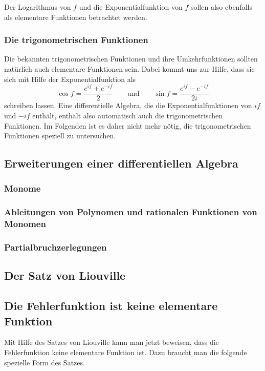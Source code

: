 Der Logarithmus von $f$ und die Exponentialfunktion von $f$ sollen
also ebenfalls als elementare Funktionen betrachtet werden.

\subsubsection{Die trigonometrischen Funktionen}
Die bekannten trigonometrischen Funktionen und ihre Umkehrfunktionen
sollten natürlich auch elementare Funktionen sein.
Dabei kommt uns zur Hilfe, dass sie sich mit Hilfe der Exponentialfunktion
als
\[
\cos f = \frac{e^{if}+e^{-if}}2
\qquad\text{und}\qquad
\sin f = \frac{e^{if}-e^{-if}}{2i}
\]
schreiben lassen.
Eine differentielle Algebra, die die Exponentialfunktionen von $if$ und
$-if$ enthält, enthält also automatisch auch die trigonometrischen
Funktionen.
Im Folgenden ist es daher nicht mehr nötig, die trigonometrischen
Funktionen speziell zu untersuchen.

\subsection{Erweiterungen einer differentiellen Algebra
\label{buch:integrale:section:erweiterungen}}

\subsubsection{Monome}

\subsubsection{Ableitungen von Polynomen und rationalen Funktionen von Monomen}

\subsubsection{Partialbruchzerlegungen}

\subsection{Der Satz von Liouville
\label{buch:integrale:section:liouville}}

\subsection{Die Fehlerfunktion ist keine elementare Funktion
\label{buch:integrale:section:fehlernichtelementar}}
Mit Hilfe des Satzes von Liouville kann man jetzt beweisen, dass 
die Fehlerfunktion keine elementare Funktion ist.
Dazu braucht man die folgende spezielle Form des Satzes.

